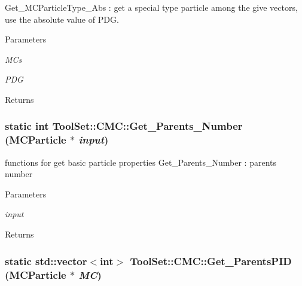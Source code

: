 Get\_\-MCParticleType\_\-Abs : get a special type particle among the give vectors, use the absolute value of PDG. 
\begin{DoxyParams}{Parameters}
\item[{\em MCs}]\item[{\em PDG}]\end{DoxyParams}
\begin{DoxyReturn}{Returns}

\end{DoxyReturn}
\hypertarget{classToolSet_1_1CMC_a67ab1d51b7fd0f98cfa19be5381e961a}{
\subsubsection[{Get\_\-Parents\_\-Number}]{\setlength{\rightskip}{0pt plus 5cm}static int ToolSet::CMC::Get\_\-Parents\_\-Number (MCParticle $\ast$ {\em input})}}
\label{classToolSet_1_1CMC_a67ab1d51b7fd0f98cfa19be5381e961a}


functions for get basic particle properties Get\_\-Parents\_\-Number : parents number 
\begin{DoxyParams}{Parameters}
\item[{\em input}]\end{DoxyParams}
\begin{DoxyReturn}{Returns}

\end{DoxyReturn}
\hypertarget{classToolSet_1_1CMC_aa98186321fc75d5f476bc97511e1d91b}{
\subsubsection[{Get\_\-ParentsPID}]{\setlength{\rightskip}{0pt plus 5cm}static std::vector$<$int$>$ ToolSet::CMC::Get\_\-ParentsPID (MCParticle $\ast$ {\em MC})}}
\label{classToolSet_1_1CMC_aa98186321fc75d5f476bc97511e1d91b}


